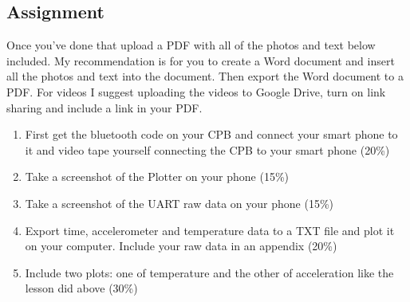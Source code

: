 \subsection{Assignment}

Once you've done that upload a PDF with all of the photos and text below included. My recommendation is for you to create a Word document and insert all the photos and text into the document. Then export the Word document to a PDF. For videos I suggest uploading the videos to Google Drive, turn on link sharing and include a link in your PDF.
\begin{enumerate}[itemsep=-5pt]
\item First get the bluetooth code on your CPB and connect your smart phone to it and video tape yourself connecting the CPB to your smart phone (20\%)
\item Take a screenshot of the Plotter on your phone (15\%)
\item Take a screenshot of the UART raw data on your phone (15\%)
\item Export time, accelerometer and temperature data to a TXT file and plot it on your computer. Include your raw data in an appendix (20\%)
\item Include two plots: one of temperature and the other of acceleration like the lesson did above (30\%)
\end{enumerate}